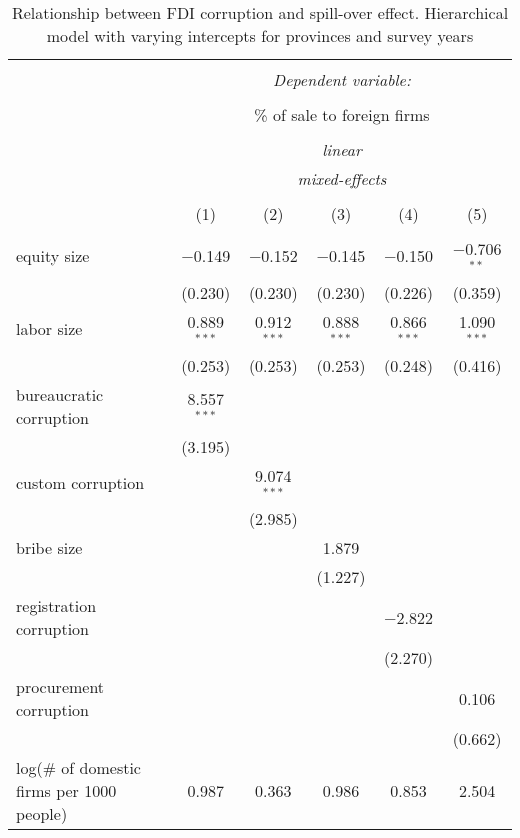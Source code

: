 
\begin{sidewaystable}[!htbp] \centering 
  \caption{Relationship between FDI corruption and spill-over effect. Hierarchical model with varying intercepts for provinces and survey years} 
  \label{tab:pci_corruption} 
\small 
\begin{tabular}{@{\extracolsep{5pt}}lccccc} 
\\[-1.8ex]\hline 
\hline \\[-1.8ex] 
 & \multicolumn{5}{c}{\textit{Dependent variable:}} \\ 
\cline{2-6} 
\\[-1.8ex] & \multicolumn{5}{c}{\% of sale to foreign firms} \\ 
\\[-1.8ex] & \multicolumn{5}{c}{\textit{linear}} \\ 
 & \multicolumn{5}{c}{\textit{mixed-effects}} \\ 
\\[-1.8ex] & (1) & (2) & (3) & (4) & (5)\\ 
\hline \\[-1.8ex] 
 equity size & $-$0.149 & $-$0.152 & $-$0.145 & $-$0.150 & $-$0.706$^{**}$ \\ 
  & (0.230) & (0.230) & (0.230) & (0.226) & (0.359) \\ 
  labor size & 0.889$^{***}$ & 0.912$^{***}$ & 0.888$^{***}$ & 0.866$^{***}$ & 1.090$^{***}$ \\ 
  & (0.253) & (0.253) & (0.253) & (0.248) & (0.416) \\ 
  bureaucratic corruption & 8.557$^{***}$ &  &  &  &  \\ 
  & (3.195) &  &  &  &  \\ 
  custom corruption &  & 9.074$^{***}$ &  &  &  \\ 
  &  & (2.985) &  &  &  \\ 
  bribe size &  &  & 1.879 &  &  \\ 
  &  &  & (1.227) &  &  \\ 
  registration corruption &  &  &  & $-$2.822 &  \\ 
  &  &  &  & (2.270) &  \\ 
  procurement corruption &  &  &  &  & 0.106 \\ 
  &  &  &  &  & (0.662) \\ 
  log(\# of domestic firms per 1000 people) & 0.987 & 0.363 & 0.986 & 0.853 & 2.504 \\ 

\end{tabular}
\end{sidewaystable}
